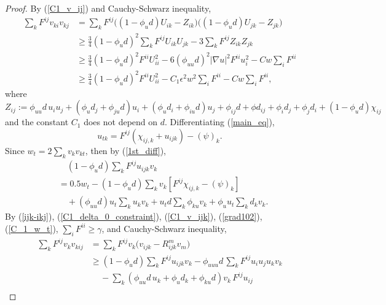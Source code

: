 \documentclass[12pt]{amsart}
\theoremstyle{definition}
\theoremstyle{remark}
\numberwithin{equation}{section}
\begin{document}
\begin{proof}
	
	By (\ref{C1_v_ij}) and Cauchy-Schwarz inequality, 
	\begin{equation}
	\begin{aligned}
	\sum_k F^{ij} v_{ki} v_{kj} & = \sum_k F^{ij}\big((1-\phi_u d) U_{ik} - Z_{ik}\big)\big((1-\phi_u d) U_{jk} - Z_{jk}\big) \\
	& \geq \frac{3}{4} (1-\phi_u d)^2 \sum_k F^{ij}  U_{ik}U_{jk} - 3 \sum_k F^{ij} Z_{ik}Z_{jk} \\
	& \geq \frac{3}{4} (1-\phi_u d)^2 F^{ii}  U_{ii}^2 - 6 (\phi_{uu} d)^2 |\nabla u|^2 F^{ii} u_i^2 - C w \sum_i F^{ii} \\
	& \geq \frac{3}{4} (1-\phi_u d)^2 F^{ii}  U_{ii}^2 - C_1 \epsilon^2 w^2 \sum_i F^{ii} - Cw\sum_i F^{ii},
	\end{aligned}
	\end{equation}
	where $Z_{ij} := \phi_{uu} d\, u_i u_j +  (\phi_u d_j + \phi_{ju}d) u_i + (\phi_u d_i + \phi_{iu}d) u_j + \phi_{ij} d + \phi d_{ij} + \phi_i d_j + \phi_j d_i + (1 - \phi_u d)\chi_{ij}$ and the constant $C_1$ does not depend on $d$.
	Differentiating (\ref{main_eq}),
	\begin{equation}\label{1st_diff}
	u_{tk} = F^{ij} (\chi_{ij,k} + u_{ijk}) - (\psi)_k.
	\end{equation}
	Since $w_t = 2 \sum_k v_k v_{kt}$, then by (\ref{1st_diff}),
	\begin{equation}\label{C_1_w_t}
	\begin{aligned}
	&\quad (1 - \phi_u d) \sum_k F^{ij} u_{ijk} v_k\\
	&= 0.5 w_t - (1 - \phi_u d) \sum_k v_k \left[ F^{ij}\chi_{ij,k} - (\psi)_k \right]\\
	& \quad + (\phi_{uu}d) u_t \sum_k u_k v_k + u_t d \sum_k \phi_{ku} v_k + \phi_u u_t \sum_k d_k v_k.
	\end{aligned}
	\end{equation}
	By (\ref{ijk-ikj}), (\ref{C1_delta_0_constraint}), (\ref{C1_v_ijk}), (\ref{grad102}), (\ref{C_1_w_t}), $\sum_i F^{ii} \geq \gamma$, and  Cauchy-Schwarz inequality,
	\begin{equation}\label{F_ij*w_ij_left_ext_2}
	\begin{aligned}
	\sum_k F^{ij} v_k v_{kij} & =  \sum_k F^{ij} v_k \big( v_{ijk} - R^m_{ijk} v_m \big) \\
	& \geq (1 - \phi_u d) \sum_k F^{ij}u_{ijk} v_k  - \phi_{uuu}d\,\sum_k F^{ij} u_i u_j u_k v_k
	\\
	& \,\,\,\,\,\,\, - \sum_k (\phi_{uu}d\, u_k + \phi_u d_k + \phi_{ku} d) v_k\, F^{ij}u_{ij} \\

\end{aligned}
\end{equation}
\end{proof}
\end{document}
